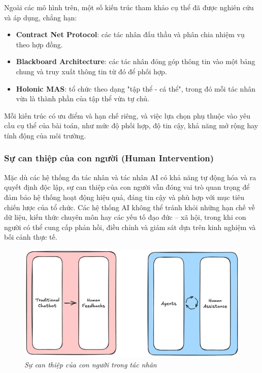 \documentclass{article}
\begin{document}
Ngoài các mô hình trên, một số kiến trúc tham khảo cụ thể đã được nghiên cứu và áp dụng, chẳng hạn:

\begin{itemize}[topsep=0pt, itemsep=2pt, leftmargin=40pt]
    \item \textbf{Contract Net Protocol}: các tác nhân đấu thầu và phân chia nhiệm vụ theo hợp đồng.
    \item \textbf{Blackboard Architecture}: các tác nhân đóng góp thông tin vào một bảng chung và truy xuất thông tin từ đó để phối hợp.
    \item \textbf{Holonic MAS}: tổ chức theo dạng "tập thể - cá thể", trong đó mỗi tác nhân vừa là thành phần của tập thể vừa tự chủ.
\end{itemize}

Mỗi kiến trúc có ưu điểm và hạn chế riêng, và việc lựa chọn phụ thuộc vào yêu cầu cụ thể của bài toán, như mức độ phối hợp, độ tin cậy, khả năng mở rộng hay tính động của môi trường.

\subsubsection{Sự can thiệp của con người (Human Intervention)}

Mặc dù các hệ thống đa tác nhân và tác nhân AI có khả năng tự động hóa và ra quyết định độc lập, sự can thiệp của con người vẫn đóng vai trò quan trọng để đảm bảo hệ thống hoạt động hiệu quả, đáng tin cậy và phù hợp với mục tiêu chiến lược của tổ chức. Các hệ thống AI không thể tránh khỏi những hạn chế về dữ liệu, kiến thức chuyên môn hay các yếu tố đạo đức – xã hội, trong khi con người có thể cung cấp phản hồi, điều chỉnh và giám sát dựa trên kinh nghiệm và bối cảnh thực tế.

\begin{figure}[H]
    \centering
    \includegraphics[width=1\linewidth]{img/human-intervention.png}
    \caption{\textit{Sự can thiệp của con người trong tác nhân}}
    \label{fig:human-intervention}
\end{figure}
\end{document}
